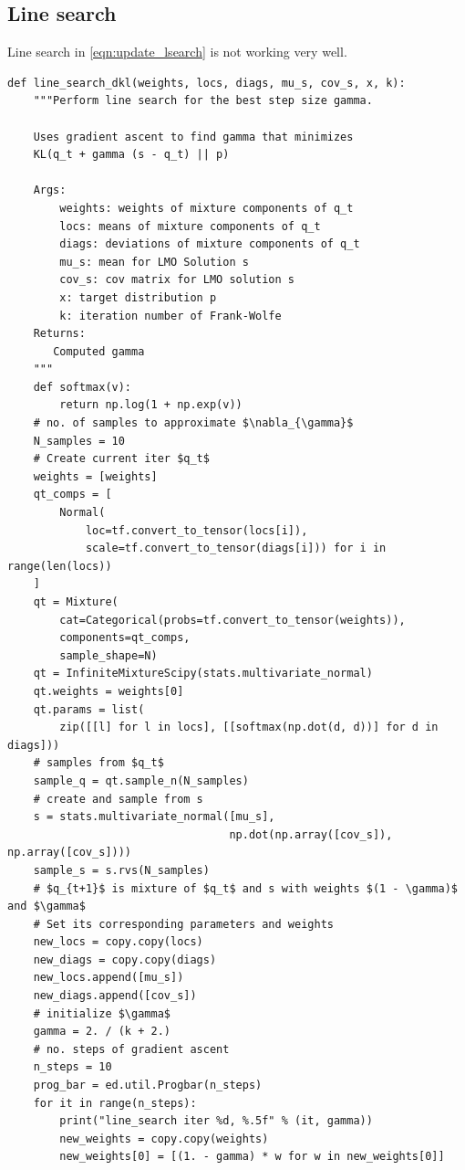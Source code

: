 \documentclass[letterpaper]{article}
\begin{document}
  \subsection{Line search}
  Line search in \ref{eqn:update_lsearch} is not working very well. 
  
  \begin{verbatim}
def line_search_dkl(weights, locs, diags, mu_s, cov_s, x, k):
    """Perform line search for the best step size gamma.
    
    Uses gradient ascent to find gamma that minimizes
    KL(q_t + gamma (s - q_t) || p)
    
    Args:
        weights: weights of mixture components of q_t
        locs: means of mixture components of q_t
        diags: deviations of mixture components of q_t
        mu_s: mean for LMO Solution s
        cov_s: cov matrix for LMO solution s
        x: target distribution p
        k: iteration number of Frank-Wolfe
    Returns:
       Computed gamma
    """
    def softmax(v):
        return np.log(1 + np.exp(v))
    # no. of samples to approximate $\nabla_{\gamma}$
    N_samples = 10
    # Create current iter $q_t$
    weights = [weights]
    qt_comps = [
        Normal(
            loc=tf.convert_to_tensor(locs[i]),
            scale=tf.convert_to_tensor(diags[i])) for i in range(len(locs))
    ]
    qt = Mixture(
        cat=Categorical(probs=tf.convert_to_tensor(weights)),
        components=qt_comps,
        sample_shape=N)
    qt = InfiniteMixtureScipy(stats.multivariate_normal)
    qt.weights = weights[0]
    qt.params = list(
        zip([[l] for l in locs], [[softmax(np.dot(d, d))] for d in diags]))
    # samples from $q_t$
    sample_q = qt.sample_n(N_samples)
    # create and sample from s
    s = stats.multivariate_normal([mu_s],
                                  np.dot(np.array([cov_s]), np.array([cov_s])))
    sample_s = s.rvs(N_samples)
    # $q_{t+1}$ is mixture of $q_t$ and s with weights $(1 - \gamma)$ and $\gamma$
    # Set its corresponding parameters and weights
    new_locs = copy.copy(locs)
    new_diags = copy.copy(diags)
    new_locs.append([mu_s])
    new_diags.append([cov_s])
    # initialize $\gamma$
    gamma = 2. / (k + 2.)
    # no. steps of gradient ascent
    n_steps = 10
    prog_bar = ed.util.Progbar(n_steps)
    for it in range(n_steps):
        print("line_search iter %d, %.5f" % (it, gamma))
        new_weights = copy.copy(weights)
        new_weights[0] = [(1. - gamma) * w for w in new_weights[0]]

\end{verbatim}
\end{document}
